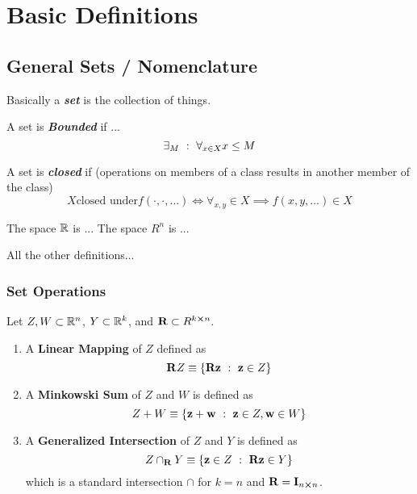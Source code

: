 \section{Basic Definitions}
\subsection{General Sets / Nomenclature}
Basically a \textbf{\emph{set}} is the collection of things. 

A set is \textbf{\emph{Bounded}} if ...\[
    \exists_{M} \ : \  \forall_{x \in X} x \leq M
\]

A set is \textbf{\emph{closed}} if (operations on members of a class results in another member of the class) \[
    X \text{closed under} f(\cdot,\cdot,\dots) \iff \forall_{x,y} \in X \implies f(x, y, \dots) \in X
\]

The space $\mathbb{R}$ is ... 
The space $R^n$ is ...


All the other definitions... 

\subsubsection{Set Operations}
\begin{definition}
    Let $Z, W \subset \mathbb{R}^n$, $Y \subset \mathbb{R}^k$, and $\vb{R} \subset R^{k \cross n}$.
    \begin{enumerate}
        \item A \textbf{Linear Mapping} of $Z$ defined as \begin{equation}
            \vb{R} Z \equiv \{\vb{R} \vb{z} \ : \  \vb{z} \in Z\}
        \end{equation}
        \item A \textbf{Minkowski Sum} of $Z$ and $W$ is defined as \begin{equation}
            Z + W \equiv \{\vb{z} + \vb{w} \ : \  \vb{z} \in Z, \vb{w} \in W\}
        \end{equation}
        \item A \textbf{Generalized Intersection} of $Z$ and $Y$ is defined as \begin{equation}
            Z \cap_{\vb{R}} Y \equiv \{\vb{z} \in Z \ : \  \vb{R} \vb{z} \in Y\}
        \end{equation}
        which is a standard intersection $\cap$ for $k = n$ and $\vb{R} = \vb{I}_{n \cross n}$.
    \end{enumerate}

\end{definition}

